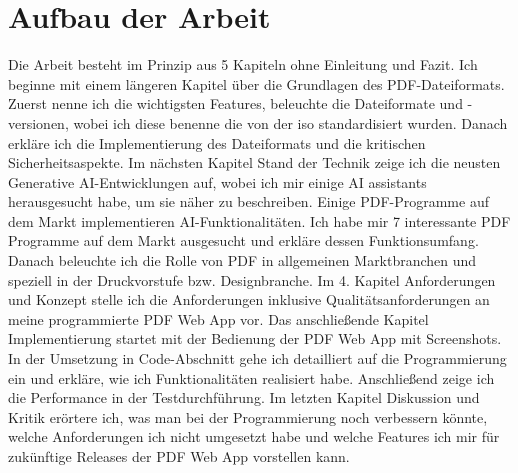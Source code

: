 \section{Aufbau der Arbeit}
Die Arbeit besteht im Prinzip aus 5 Kapiteln ohne Einleitung und Fazit. Ich beginne mit einem längeren Kapitel über die Grundlagen des PDF-Dateiformats. Zuerst nenne ich die wichtigsten Features, beleuchte die Dateiformate und -versionen, wobei ich diese benenne die von der \gls{iso} standardisiert wurden. Danach erkläre ich die Implementierung des Dateiformats und die kritischen Sicherheitsaspekte. Im nächsten Kapitel Stand der Technik zeige ich die neusten Generative AI-Entwicklungen auf, wobei ich mir einige AI assistants herausgesucht habe, um sie näher zu beschreiben. Einige PDF-Programme auf dem Markt implementieren AI-Funktionalitäten. Ich habe mir 7 interessante PDF Programme auf dem Markt ausgesucht und erkläre dessen Funktionsumfang. Danach beleuchte ich die Rolle von PDF in allgemeinen Marktbranchen und speziell in der Druckvorstufe bzw. Designbranche. Im 4. Kapitel Anforderungen und Konzept stelle ich die Anforderungen inklusive Qualitätsanforderungen an meine programmierte PDF Web App vor. Das anschließende Kapitel Implementierung startet mit der Bedienung der PDF Web App mit Screenshots. In der Umsetzung in Code-Abschnitt gehe ich detailliert auf die Programmierung ein und erkläre, wie ich Funktionalitäten realisiert habe. Anschließend zeige ich die Performance in der Testdurchführung. Im letzten Kapitel Diskussion und Kritik erörtere ich, was man bei der Programmierung noch verbessern könnte, welche Anforderungen ich nicht umgesetzt habe und welche Features ich mir für zukünftige Releases der PDF Web App vorstellen kann. 